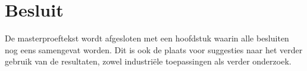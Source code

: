 \chapter{Besluit}
\label{besluit}
De masterproeftekst wordt afgesloten met een hoofdstuk waarin alle
besluiten nog eens samengevat worden. Dit is ook de plaats voor suggesties
naar het verder gebruik van de resultaten, zowel industriële toepassingen
als verder onderzoek.

\lipsum[1-7]
